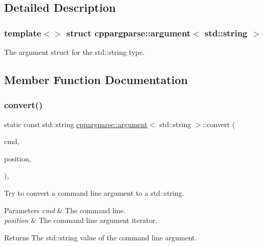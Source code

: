 \subsection{Detailed Description}
\subsubsection*{template$<$$>$\newline
struct cppargparse\+::argument$<$ std\+::string $>$}

The argument struct for the std\+::string type. 

\subsection{Member Function Documentation}
\mbox{\label{structcppargparse_1_1argument_3_01std_1_1string_01_4_aa54c1d7414d89a1071bb7cdb07be0b00}} 
\subsubsection{\texorpdfstring{convert()}{convert()}}
{\footnotesize\ttfamily static const std\+::string \hyperlink{structcppargparse_1_1argument}{cppargparse\+::argument}$<$ std\+::string $>$\+::convert (\begin{DoxyParamCaption}\item[{const types\+::\+Command\+Line\+\_\+t \&}]{cmd,  }\item[{const types\+::\+Command\+Line\+Position\+\_\+t \&}]{position,  }\item[{const types\+::\+Command\+Line\+Arguments\+\_\+t \&}]{ }\end{DoxyParamCaption})\hspace{0.3cm}{\ttfamily [inline]}, {\ttfamily [static]}}



Try to convert a command line argument to a std\+::string. 


\begin{DoxyParams}{Parameters}
{\em cmd} & The command line. \\
\hline
{\em position} & The command line argument iterator.\\
\hline
\end{DoxyParams}
\begin{DoxyReturn}{Returns}
The std\+::string value of the command line argument. 
\end{DoxyReturn}

